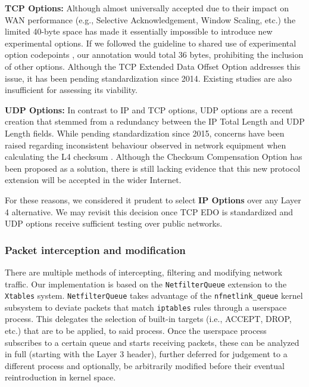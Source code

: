 \textbf{TCP Options:} Although almost universally accepted due to their impact on WAN performance (e.g., Selective Acknowledgement, Window Scaling, etc.) the limited 40-byte space \cite{john1981transmission} has made it essentially impossible to introduce new experimental options. If we followed the guideline to shared use of experimental option codepoints \cite{rfc6994}, our annotation would total 36 bytes, prohibiting the inclusion of other options. Although the TCP Extended Data Offset Option \cite{ietf-tcpm-tcp-edo-13} addresses this issue, it has been pending standardization since 2014. Existing studies \cite{trieu2015implementation} are also insufficient for assessing its viability.

\textbf{UDP Options:} In contrast to IP and TCP options, UDP options are a recent creation \cite{ietf-tsvwg-udp-options-23} that stemmed from a redundancy between the IP Total Length and UDP Length fields. While pending standardization since 2015, concerns have been raised regarding inconsistent behaviour observed in network equipment when calculating the L4 checksum \cite{zullo2020overcoming}. Although the Checksum Compensation Option \cite{fairhurst-udp-options-cco-00} has been proposed as a solution, there is still lacking evidence that this new protocol extension will be accepted in the wider Internet.

For these reasons, we considered it prudent to select \textbf{IP Options} over any Layer 4 alternative. We may revisit this decision once TCP EDO is standardized and UDP options receive sufficient testing over public networks.


\subsubsection{Packet interception and modification}

There are multiple methods of intercepting, filtering and modifying network traffic. Our implementation is based on the \texttt{NetfilterQueue} extension to the \texttt{Xtables} system. \texttt{NetfilterQueue} takes advantage of the \texttt{nfnetlink\_queue} kernel subsystem to deviate packets that match \texttt{iptables} rules through a userspace process. This delegates the selection of built-in targets (i.e., ACCEPT, DROP, etc.) that are to be applied, to said process. Once the userspace process subscribes to a certain queue and starts receiving packets, these can be analyzed in full (starting with the Layer 3 header), further deferred for judgement to a different process and optionally, be arbitrarily modified before their eventual reintroduction in kernel space.

